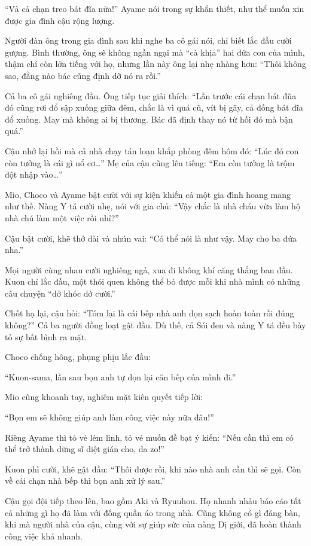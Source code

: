\documentclass[../main.tex]{subfiles}
\begin{document}
``Và cả chạn treo bát đĩa nữa!'' Ayame nói trong sự khẩn thiết, như thể muốn xin được gia đình cậu rộng lượng.

Người đàn ông trong gia đình sau khi nghe ba cô gái nói, chỉ biết lắc đầu cười gượng. Bình thường, ông sẽ không ngần ngại mà ``cà khịa'' hai đứa con của mình, thậm chí còn lớn tiếng với họ, nhưng lần này ông lại nhẹ nhàng hơn: ``Thôi không sao, đằng nào bác cũng định dỡ nó ra rồi.''

Cả ba cô gái nghiêng đầu. Ông tiếp tục giải thích: ``Lần trước cái chạn bát đũa đó cũng rơi đổ sập xuống giữa đêm, chắc là vì quá cũ, vít bị gãy, cả đống bát đĩa đổ xuống. May mà không ai bị thương. Bác đã định thay nó từ hồi đó mà bận quá.''

Cậu nhớ lại hồi mà cả nhà chạy tán loạn khắp phòng đêm hôm đó: ``Lúc đó con còn tưởng là cái gì nổ cơ\dots'' Mẹ của cậu cũng lên tiếng: ``Em còn tưởng là trộm đột nhập vào\dots''

Mio, Choco và Ayame bật cười với sự kiện khiến cả một gia đình hoang mang như thế. Nàng Y tá cười nhẹ, nói với gia chủ: ``Vậy chắc là nhà cháu vừa làm hộ nhà chú làm một việc rồi nhỉ?''

Cậu bật cười, khẽ thở dài và nhún vai: ``Có thể nói là như vậy. May cho ba đứa nha.''

Mọi người cùng nhau cười nghiêng ngả, xua đi không khí căng thẳng ban đầu. Kuon chỉ lắc đầu, một thói quen không thể bỏ được mỗi khi nhà mình có những câu chuyện ``dở khóc dở cười.''

Chốt hạ lại, cậu hỏi: ``Tóm lại là cái bếp nhà anh dọn sạch hoàn toàn rồi đúng không?'' Cả ba người đồng loạt gật đầu. Dù thế, cả Sói đen và nàng Y tá đều bày tỏ sự bất bình ra mặt.

Choco chống hông, phụng phịu lắc đầu:

``Kuon-sama, lần sau bọn anh tự dọn lại căn bếp của mình đi.''

Mio cũng khoanh tay, nghiêm mặt kiên quyết tiếp lời:

``Bọn em sẽ không giúp anh làm công việc này nữa đâu!''

Riêng Ayame thì tỏ vẻ lém lỉnh, tỏ vẻ muốn đề bạt ý kiến: ``Nếu cần thì em có thể trở thành dững sĩ diệt gián cho, da zo!''

Kuon phì cười, khẽ gật đầu: ``Thôi được rồi, khi nào nhà anh cần thì sẽ gọi. Còn về cái chạn nhà bếp thì bọn anh xử lý sau.''

Cậu gọi đội tiếp theo lên, bao gồm Aki và Ryuuhou. Họ nhanh nhảu báo cáo tất cả những gì họ đã làm với đống quần áo trong nhà. Cũng không có gì đáng bàn, khi mà người nhà của cậu, cùng với sự giúp sức của nàng Dị giới, đã hoàn thành công việc khá nhanh.
\end{document}
